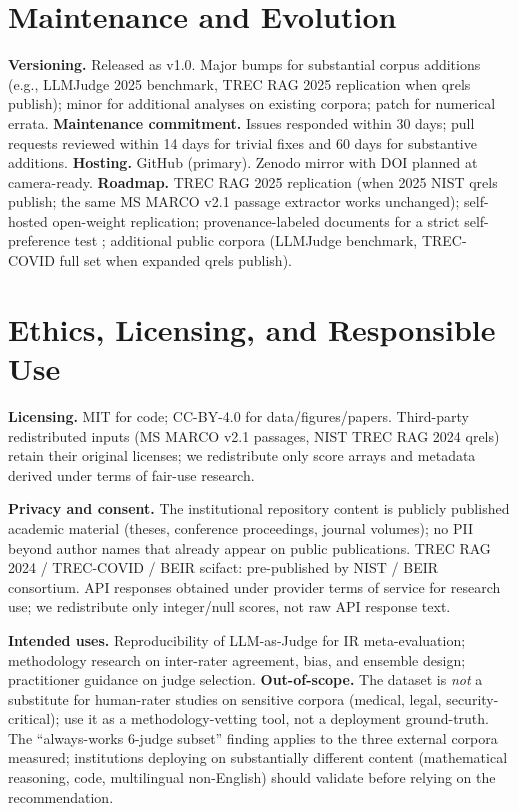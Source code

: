 \documentclass{article}
\begin{document}
\section{Maintenance and Evolution}

\textbf{Versioning.} Released as v1.0. Major bumps for substantial corpus additions (e.g., LLMJudge 2025 benchmark, TREC RAG 2025 replication when qrels publish); minor for additional analyses on existing corpora; patch for numerical errata. \textbf{Maintenance commitment.} Issues responded within 30 days; pull requests reviewed within 14 days for trivial fixes and 60 days for substantive additions. \textbf{Hosting.} GitHub (primary). Zenodo mirror with DOI planned at camera-ready. \textbf{Roadmap.} TREC RAG 2025 replication (when 2025 NIST qrels publish; the same MS MARCO v2.1 passage extractor works unchanged); self-hosted open-weight replication; provenance-labeled documents for a strict self-preference test \citep{panickssery2024self}; additional public corpora (LLMJudge benchmark, TREC-COVID full set when expanded qrels publish).

\section{Ethics, Licensing, and Responsible Use}

\textbf{Licensing.} MIT for code; CC-BY-4.0 for data/figures/papers. Third-party redistributed inputs (MS MARCO v2.1 passages, NIST TREC RAG 2024 qrels) retain their original licenses; we redistribute only score arrays and metadata derived under terms of fair-use research.

\textbf{Privacy and consent.} The institutional repository content is publicly published academic material (theses, conference proceedings, journal volumes); no PII beyond author names that already appear on public publications. TREC RAG 2024 / TREC-COVID / BEIR scifact: pre-published by NIST / BEIR consortium. API responses obtained under provider terms of service for research use; we redistribute only integer/null scores, not raw API response text.

\textbf{Intended uses.} Reproducibility of LLM-as-Judge for IR meta-evaluation; methodology research on inter-rater agreement, bias, and ensemble design; practitioner guidance on judge selection. \textbf{Out-of-scope.} The dataset is \emph{not} a substitute for human-rater studies on sensitive corpora (medical, legal, security-critical); use it as a methodology-vetting tool, not a deployment ground-truth. The ``always-works 6-judge subset'' finding applies to the three external corpora measured; institutions deploying on substantially different content (mathematical reasoning, code, multilingual non-English) should validate before relying on the recommendation.
\end{document}

